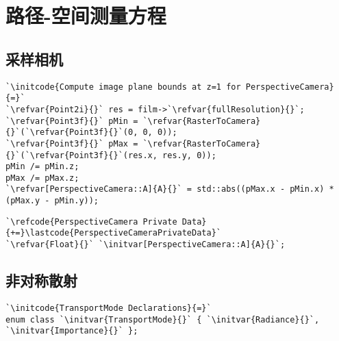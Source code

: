 \section{路径-空间测量方程}\label{sec:路径-空间测量方程}

\subsection{采样相机}\label{sub:采样相机2}
\begin{lstlisting}
`\initcode{Compute image plane bounds at z=1 for PerspectiveCamera}{=}`
`\refvar{Point2i}{}` res = film->`\refvar{fullResolution}{}`;
`\refvar{Point3f}{}` pMin = `\refvar{RasterToCamera}{}`(`\refvar{Point3f}{}`(0, 0, 0));
`\refvar{Point3f}{}` pMax = `\refvar{RasterToCamera}{}`(`\refvar{Point3f}{}`(res.x, res.y, 0));
pMin /= pMin.z;
pMax /= pMax.z;
`\refvar[PerspectiveCamera::A]{A}{}` = std::abs((pMax.x - pMin.x) * (pMax.y - pMin.y));
\end{lstlisting}
\begin{lstlisting}
`\refcode{PerspectiveCamera Private Data}{+=}\lastcode{PerspectiveCameraPrivateData}`
`\refvar{Float}{}` `\initvar[PerspectiveCamera::A]{A}{}`;
\end{lstlisting}
\subsection{非对称散射}\label{sub:非对称散射}
\begin{lstlisting}
`\initcode{TransportMode Declarations}{=}`
enum class `\initvar{TransportMode}{}` { `\initvar{Radiance}{}`, `\initvar{Importance}{}` };
\end{lstlisting}